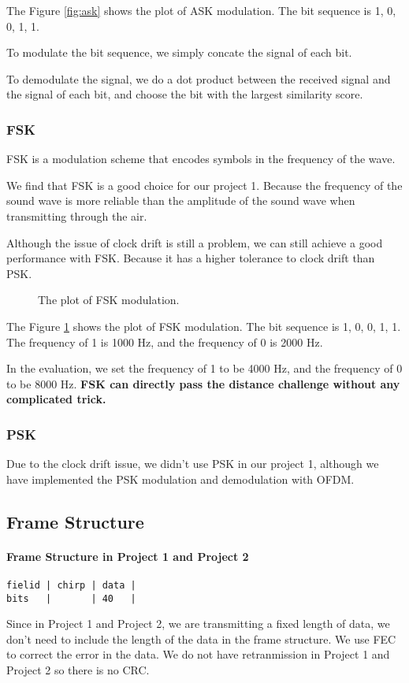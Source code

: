 \documentclass{article}
\begin{document}
The Figure \ref{fig:ask} shows the plot of ASK modulation.
The bit sequence is 1, 0, 0, 1, 1.

To modulate the bit sequence, we simply concate the signal of each bit.

To demodulate the signal, we do a dot product between the received signal and the signal of each bit, and choose the bit with the largest similarity score.

\subsubsection{FSK}

FSK is a modulation scheme that encodes symbols in the frequency of the wave.

We find that FSK is a good choice for our project 1. Because the frequency of the sound wave is more reliable than the amplitude of the sound wave when transmitting through the air.

Although the issue of clock drift is still a problem, we can still achieve a good performance with FSK. Because it has a higher tolerance to clock drift than PSK.

\begin{figure}[H]
    \noindent\makebox[\textwidth]{}
    \caption{The plot of FSK modulation.}
    \label{fig:fsk}
\end{figure}

The Figure \ref{fig:fsk} shows the plot of FSK modulation. The bit sequence is 1, 0, 0, 1, 1. The frequency of 1 is 1000 Hz, and the frequency of 0 is 2000 Hz.

In the evaluation, we set the frequency of 1 to be 4000 Hz, and the frequency of 0 to be 8000 Hz. \textbf{FSK can directly pass the distance challenge without any complicated trick.}

\subsubsection{PSK}

Due to the clock drift issue, we didn't use PSK in our project 1, although we have implemented the PSK modulation and demodulation with OFDM.

\subsection{Frame Structure}

\paragraph{Frame Structure in Project 1 and Project 2}
\begin{verbatim}
fielid | chirp | data |
bits   |       | 40   |
\end{verbatim}
Since in Project 1 and Project 2, we are transmitting a fixed length of data, we don't need to include the length of the data in the frame structure.
We use FEC to correct the error in the data. We do not have retranmission in Project 1 and Project 2 so there is no CRC.
\end{document}
